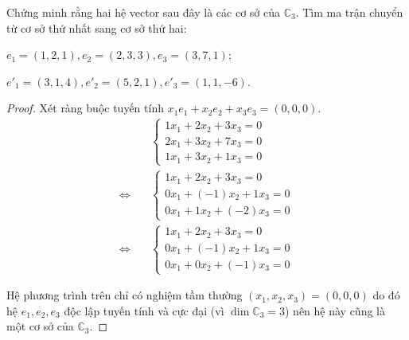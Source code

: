 \documentclass[class=linearalgebra,crop=false]{standalone}
\begin{document}
\begin{exercise}Chứng minh rằng hai hệ vector sau đây là các cơ sở của $\mathbb{C}_{3}$. Tìm ma trận chuyển từ cơ sở thứ nhất sang cơ sở thứ hai:
    \par $e_{1} = (1, 2, 1), e_{2} = (2, 3, 3), e_{3} = (3, 7, 1)$;
    \par $e'_{1} = (3, 1, 4), e'_{2} = (5, 2, 1), e'_{3} = (1, 1, -6)$.
\end{exercise}

\begin{proof}Xét ràng buộc tuyến tính $x_{1}e_{1} + x_{2}e_{2} + x_{3}e_{3} = (0, 0, 0)$.
    \begin{align*}
        &\begin{cases}
            1x_{1} + 2x_{2} + 3x_{3} = 0 \\
            2x_{1} + 3x_{2} + 7x_{3} = 0 \\
            1x_{1} + 3x_{2} + 1x_{3} = 0
        \end{cases} \\
        \Leftrightarrow\quad&
        \begin{cases}
            1x_{1} + 2x_{2} + 3x_{3} = 0 \\
            0x_{1} + (-1)x_{2} + 1x_{3} = 0 \\
            0x_{1} + 1x_{2} + (-2)x_{3} = 0
        \end{cases} \\
        \Leftrightarrow\quad&
        \begin{cases}
            1x_{1} + 2x_{2} + 3x_{3} = 0 \\
            0x_{1} + (-1)x_{2} + 1x_{3} = 0 \\
            0x_{1} + 0x_{2} + (-1)x_{3} = 0
        \end{cases}
    \end{align*}
    \par Hệ phương trình trên chỉ có nghiệm tầm thường $(x_{1}, x_{2}, x_{3}) = (0, 0, 0)$ do đó hệ $e_{1}, e_{2}, e_{3}$ độc lập tuyến tính và cực đại (vì $\dim\mathbb{C}_{3} = 3$) nên hệ này cũng là một cơ sở của $\mathbb{C}_{3}$.


\end{proof}
\end{document}
